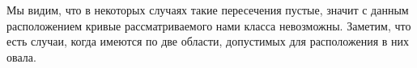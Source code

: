 \documentclass[14pt]{article}
\begin{document}
Мы видим, что в некоторых случаях такие пересечения пустые, значит с данным расположением кривые рассматриваемого нами класса невозможны.
Заметим, что есть случаи, когда имеются по две области, допустимых для расположения в них овала.







\makeatother
\end{document}
